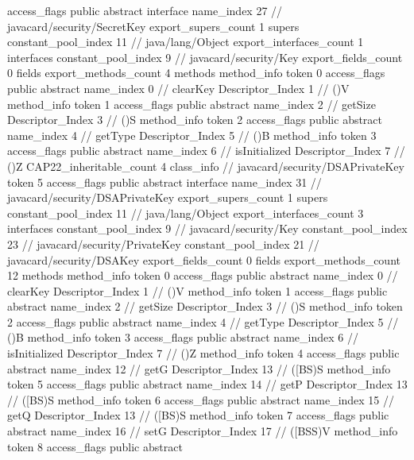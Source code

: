{{{			access_flags	public abstract interface
			name_index	27		// javacard/security/SecretKey
			export_supers_count	1
			supers {
				constant_pool_index	11		// java/lang/Object
			}
			export_interfaces_count	1
			interfaces {
				constant_pool_index	9		// javacard/security/Key
			}
			export_fields_count	0
			fields {
			}
			export_methods_count	4
			methods {
				method_info {
					token	0
					access_flags	public abstract
					name_index	0		// clearKey
					Descriptor_Index	1		// ()V
				}
				method_info {
					token	1
					access_flags	public abstract
					name_index	2		// getSize
					Descriptor_Index	3		// ()S
				}
				method_info {
					token	2
					access_flags	public abstract
					name_index	4		// getType
					Descriptor_Index	5		// ()B
				}
				method_info {
					token	3
					access_flags	public abstract
					name_index	6		// isInitialized
					Descriptor_Index	7		// ()Z
				}
			}
			CAP22_inheritable_count	4
		}
		class_info {		// javacard/security/DSAPrivateKey
			token	5
			access_flags	public abstract interface
			name_index	31		// javacard/security/DSAPrivateKey
			export_supers_count	1
			supers {
				constant_pool_index	11		// java/lang/Object
			}
			export_interfaces_count	3
			interfaces {
				constant_pool_index	9		// javacard/security/Key
				constant_pool_index	23		// javacard/security/PrivateKey
				constant_pool_index	21		// javacard/security/DSAKey
			}
			export_fields_count	0
			fields {
			}
			export_methods_count	12
			methods {
				method_info {
					token	0
					access_flags	public abstract
					name_index	0		// clearKey
					Descriptor_Index	1		// ()V
				}
				method_info {
					token	1
					access_flags	public abstract
					name_index	2		// getSize
					Descriptor_Index	3		// ()S
				}
				method_info {
					token	2
					access_flags	public abstract
					name_index	4		// getType
					Descriptor_Index	5		// ()B
				}
				method_info {
					token	3
					access_flags	public abstract
					name_index	6		// isInitialized
					Descriptor_Index	7		// ()Z
				}
				method_info {
					token	4
					access_flags	public abstract
					name_index	12		// getG
					Descriptor_Index	13		// ([BS)S
				}
				method_info {
					token	5
					access_flags	public abstract
					name_index	14		// getP
					Descriptor_Index	13		// ([BS)S
				}
				method_info {
					token	6
					access_flags	public abstract
					name_index	15		// getQ
					Descriptor_Index	13		// ([BS)S
				}
				method_info {
					token	7
					access_flags	public abstract
					name_index	16		// setG
					Descriptor_Index	17		// ([BSS)V
				}
				method_info {
					token	8
					access_flags	public abstract
}}}}}
